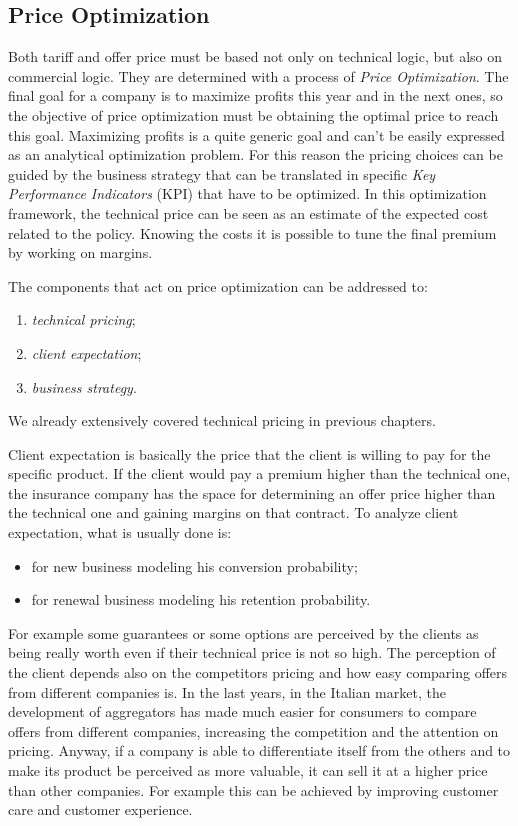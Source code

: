 \documentclass[a4paper, twoside, openright, 12pt]{report}
\providecommand{\tightlist}{%
  \setlength{\itemsep}{0pt}\setlength{\parskip}{0pt}}
\theoremstyle{definition}
\theoremstyle{definition}
\theoremstyle{definition}
\theoremstyle{remark}
\begin{document}
\hypertarget{price-optimization}{%
\subsection{Price Optimization}\label{price-optimization}}

Both tariff and offer price must be based not only on technical logic, but also on commercial logic. They are determined with a process of \emph{Price Optimization}. The final goal for a company is to maximize profits this year and in the next ones, so the objective of price optimization must be obtaining the optimal price to reach this goal. Maximizing profits is a quite generic goal and can't be easily expressed as an analytical optimization problem. For this reason the pricing choices can be guided by the business strategy that can be translated in specific \emph{Key Performance Indicators} (KPI) that have to be optimized. In this optimization framework, the technical price can be seen as an estimate of the expected cost related to the policy. Knowing the costs it is possible to tune the final premium by working on margins.

The components that act on price optimization can be addressed to:

\begin{enumerate}
\def\labelenumi{\arabic{enumi}.}
\tightlist
\item
  \emph{technical pricing};
\item
  \emph{client expectation};
\item
  \emph{business strategy}.
\end{enumerate}

We already extensively covered technical pricing in previous chapters.

Client expectation is basically the price that the client is willing to pay for the specific product. If the client would pay a premium higher than the technical one, the insurance company has the space for determining an offer price higher than the technical one and gaining margins on that contract. To analyze client expectation, what is usually done is:

\begin{itemize}
\tightlist
\item
  for new business modeling his conversion probability;
\item
  for renewal business modeling his retention probability.
\end{itemize}

For example some guarantees or some options are perceived by the clients as being really worth even if their technical price is not so high. The perception of the client depends also on the competitors pricing and how easy comparing offers from different companies is. In the last years, in the Italian market, the development of aggregators has made much easier for consumers to compare offers from different companies, increasing the competition and the attention on pricing. Anyway, if a company is able to differentiate itself from the others and to make its product be perceived as more valuable, it can sell it at a higher price than other companies. For example this can be achieved by improving customer care and customer experience.
\end{document}
